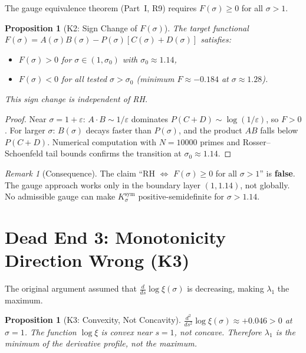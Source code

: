 \documentclass[12pt,a4paper]{article}
\newtheorem{proposition}[theorem]{Proposition}
\theoremstyle{definition}
\theoremstyle{remark}
\newtheorem{remark}[theorem]{Remark}
\newcommand{\Ksym}{K_\sigma^{\mathrm{sym}}}
\begin{document}
The gauge equivalence theorem (Part~I, R9) requires $F(\sigma) \geq 0$ for all $\sigma > 1$.

\begin{proposition}[K2: Sign Change of $F(\sigma)$]
\label{prop:K2}
The target functional $F(\sigma) = A(\sigma)B(\sigma) - P(\sigma)[C(\sigma) + D(\sigma)]$ satisfies:
\begin{itemize}
  \item $F(\sigma) > 0$ for $\sigma \in (1, \sigma_0)$ with $\sigma_0 \approx 1.14$,
  \item $F(\sigma) < 0$ for all tested $\sigma > \sigma_0$ (minimum $F \approx -0.184$ at $\sigma \approx 1.28$).
\end{itemize}
This sign change is independent of RH.
\end{proposition}

\begin{proof}
Near $\sigma = 1 + \varepsilon$: $A \cdot B \sim 1/\varepsilon$ dominates $P(C+D) \sim \log(1/\varepsilon)$, so $F > 0$. For larger $\sigma$: $B(\sigma)$ decays faster than $P(\sigma)$, and the product $AB$ falls below $P(C+D)$. Numerical computation with $N = 10000$ primes and Rosser--Schoenfeld tail bounds confirms the transition at $\sigma_0 \approx 1.14$.
\end{proof}

\begin{remark}[Consequence]
The claim ``RH $\Leftrightarrow$ $F(\sigma) \geq 0$ for all $\sigma > 1$'' is \textbf{false}. The gauge approach works only in the boundary layer $(1, 1.14)$, not globally. No admissible gauge can make $\Ksym$ positive-semidefinite for $\sigma > 1.14$.
\end{remark}


\section{Dead End 3: Monotonicity Direction Wrong (K3)}
\label{sec:K3}

The original argument assumed that $\frac{d}{ds}\log\xi(\sigma)$ is decreasing, making $\lambda_1$ the maximum.

\begin{proposition}[K3: Convexity, Not Concavity]
\label{prop:K3}
$\frac{d^2}{ds^2}\log\xi(\sigma) \approx +0.046 > 0$ at $\sigma = 1$. The function $\log\xi$ is \emph{convex} near $s = 1$, not concave. Therefore $\lambda_1$ is the \emph{minimum} of the derivative profile, not the maximum.
\end{proposition}
\end{document}
